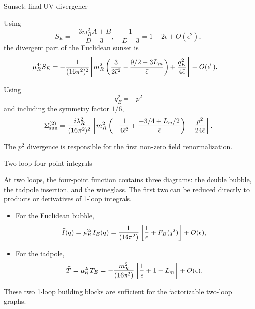 \documentclass[aspectratio=169,10pt]{beamer}
\begin{document}
\begin{frame}{Sunset: final UV divergence}

Using
\begin{equation}
S_E
=
-\frac{3m_R^2A+B}{D-3},\quad
\frac1{D-3}
=
1+2\epsilon+O(\epsilon^2),
\end{equation}
the divergent part of the Euclidean sunset is
\begin{align}
\mu_R^{4\epsilon}S_E
=
-\frac1{(16\pi^2)^2}
\Bigg[
&m_R^2
\left(
\frac3{2\bar\epsilon^2}
+
\frac{9/2-3L_m}{\bar\epsilon}
\right) +
\frac{q_E^2}{4\bar\epsilon}
\Bigg]
+
O(\epsilon^0).
\end{align}

Using
\begin{equation}
q_E^2=-p^2
\end{equation}
and including the symmetry factor $1/6$,
\begin{equation}
\Sigma_{\mathrm{sun}}^{(2)}
=
\frac{i\lambda_R^2}{(16\pi^2)^2}
\left[
m_R^2
\left(
-\frac1{4\bar\epsilon^2}
+
\frac{-3/4+L_m/2}{\bar\epsilon}
\right)
+
\frac{p^2}{24\bar\epsilon}
\right].
\end{equation}

The $p^2$ divergence is responsible for the first non-zero
field renormalization.


\end{frame}


\begin{frame}{Two-loop four-point integrals}

At two loops, the four-point function contains three diagrams: the double bubble, the tadpole insertion, and the wineglass. The first two can be reduced directly to products or derivatives
of 1-loop integrals.
\begin{itemize}
    \item For the Euclidean bubble,
\begin{equation}
\widehat I(q)
=
\mu_R^{2\epsilon}I_E(q)
=
\frac1{(16\pi^2)}
\left[
\frac1{\bar\epsilon}
+
F_B(q^2)
\right]
+
O(\epsilon);
\end{equation}
\item For the tadpole,
\begin{equation}
\widehat T
=
\mu_R^{2\epsilon}T_E
=
-\frac{m_R^2}{(16\pi^2)}
\left[
\frac1{\bar\epsilon}
+
1-L_m
\right]
+
O(\epsilon).
\end{equation}
\end{itemize}

These two 1-loop building blocks are sufficient for the
factorizable two-loop graphs.


\end{frame}
\end{document}
